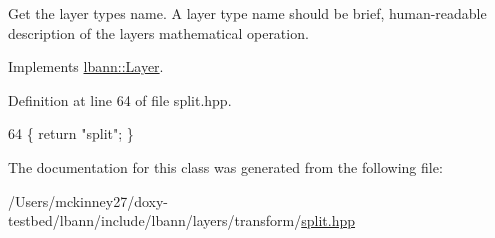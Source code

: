 Get the layer type\textquotesingle{}s name. A layer type name should be brief, human-\/readable description of the layer\textquotesingle{}s mathematical operation. 

Implements \hyperlink{classlbann_1_1Layer_a0fa0ea9160b490c151c0a17fde4f7239}{lbann\+::\+Layer}.



Definition at line 64 of file split.\+hpp.


\begin{DoxyCode}
64 \{ \textcolor{keywordflow}{return} \textcolor{stringliteral}{"split"}; \}
\end{DoxyCode}


The documentation for this class was generated from the following file\+:\begin{DoxyCompactItemize}
\item 
/\+Users/mckinney27/doxy-\/testbed/lbann/include/lbann/layers/transform/\hyperlink{split_8hpp}{split.\+hpp}\end{DoxyCompactItemize}
